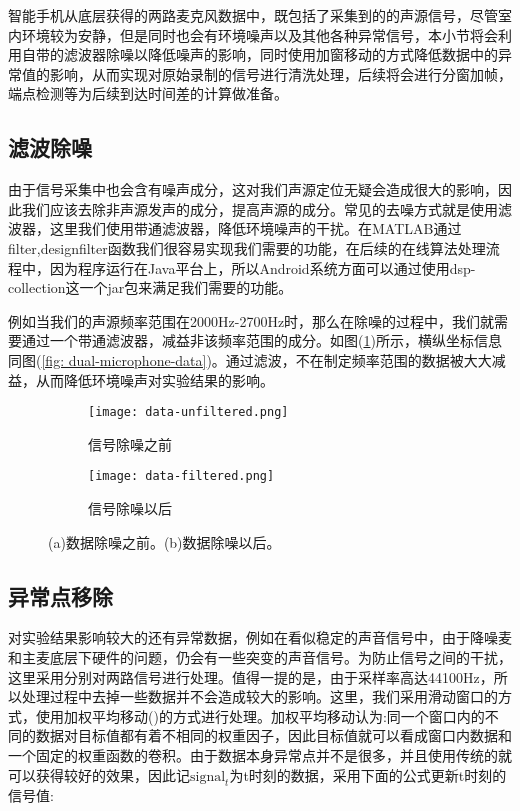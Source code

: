 \documentclass[winfonts]{njuthesis}
\begin{document}
		智能手机从底层获得的两路麦克风数据中，既包括了采集到的的声源信号，尽管室内环境较为安静，但是同时也会有环境噪声以及其他各种异常信号，本小节将会利用自带的滤波器除噪以降低噪声的影响，同时使用加窗移动的方式降低数据中的异常值的影响，从而实现对原始录制的信号进行清洗处理，后续将会进行分窗加帧，端点检测等为后续到达时间差的计算做准备。

		\subsection{滤波除噪}
			
			由于信号采集中也会含有噪声成分，这对我们声源定位无疑会造成很大的影响，因此我们应该去除非声源发声的成分，提高声源的成分。常见的去噪方式就是使用滤波器，这里我们使用带通滤波器，降低环境噪声的干扰。在MATLAB通过filter,designfilter函数我们很容易实现我们需要的功能，在后续的在线算法处理流程中，因为程序运行在Java平台上，所以Android系统方面可以通过使用dsp-collection这一个jar包来满足我们需要的功能。
			
			例如当我们的声源频率范围在2000Hz-2700Hz时，那么在除噪的过程中，我们就需要通过一个带通滤波器，减益非该频率范围的成分。如图(\ref{fig: filter-data})所示，横纵坐标信息同图(\ref{fig: dual-microphone-data})。通过滤波，不在制定频率范围的数据被大大减益，从而降低环境噪声对实验结果的影响。
			
			\begin{figure}[H]
				\centering
				\begin{subfigure}{.45\textwidth}
					\centering
					\texttt{[image: data-unfiltered.png]}
					\caption{信号除噪之前}
				\end{subfigure}
				\begin{subfigure}{.45\textwidth}
					\centering
					\texttt{[image: data-filtered.png]}
					\caption{信号除噪以后}
				\end{subfigure}
				\caption{(a)数据除噪之前。(b)数据除噪以后。}
				\label{fig: filter-data}
			\end{figure}
					
		\subsection{异常点移除}
		
			对实验结果影响较大的还有异常数据，例如在看似稳定的声音信号中，由于降噪麦和主麦底层下硬件的问题，仍会有一些突变的声音信号。为防止信号之间的干扰，这里采用分别对两路信号进行处理。值得一提的是，由于采样率高达44100Hz，所以处理过程中去掉一些数据并不会造成较大的影响。这里，我们采用滑动窗口的方式，使用加权平均移动(\cite{Moving_average})的方式进行处理。加权平均移动认为:同一个窗口内的不同的数据对目标值都有着不相同的权重因子，因此目标值就可以看成窗口内数据和一个固定的权重函数的卷积。由于数据本身异常点并不是很多，并且使用传统的就可以获得较好的效果，因此记$\text{signal}_t$为t时刻的数据，采用下面的公式更新t时刻的信号值:
			
\end{document}
